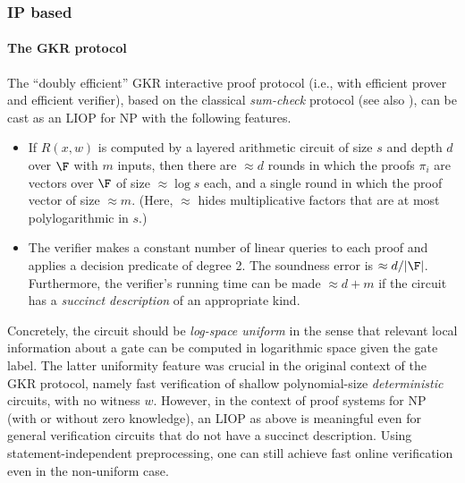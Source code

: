 

\subsubsection{IP based}
\label{paradigms:IT:linear-IOP:IP-based}


\paragraph{\bf The GKR protocol}
The ``doubly efficient'' GKR interactive proof protocol \cite{2008:GKR} (i.e., with efficient prover and efficient verifier), based on the classical {\em sum-check} protocol \cite{1992:LFKN:algebraic} (see also \cite{2020:z-blog:sum-check-protocol}), can be cast as an LIOP for NP with the following features. 


\begin{itemize}
    \item If $R(x,w)$ is computed by a layered arithmetic circuit of size $s$ and depth $d$ over $\F$ with $m$ inputs, then there are $\approx d$ rounds in which the proofs $\pi_i$ are vectors over $\F$ of size $\approx \log s$ each, and a single round in which the proof vector of size $\approx m$. (Here, $\approx$ hides multiplicative factors that are at most polylogarithmic in $s$.) 
    \item The verifier makes a constant number of linear queries to each proof and applies a decision predicate of degree 2. The soundness error is $\approx d/|\F|$.
    Furthermore, the verifier's running time can be made $\approx d+m$ if the circuit has a {\em succinct description} of an appropriate kind.
\end{itemize}



Concretely, the circuit should be {\em log-space uniform} in the sense that relevant local information about a gate can be computed in logarithmic space given the gate label.
The latter uniformity feature was crucial in the original context of the GKR protocol, namely fast verification of shallow polynomial-size {\em deterministic} circuits, with no witness $w$.
However, in the context of proof systems for NP (with or without zero knowledge), an LIOP as above is meaningful even for general verification circuits that do not have a succinct description.
Using statement-independent preprocessing, one can still achieve fast online verification even in the non-uniform case.
\loosen



